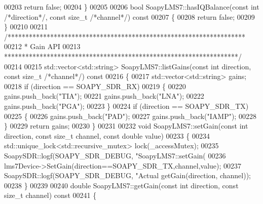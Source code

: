 \begin{DoxyCode}
{{{{{{00203     \textcolor{keywordflow}{return} \textcolor{keyword}{false};
00204 \}
00205 
00206 \textcolor{keywordtype}{bool} SoapyLMS7::hasIQBalance(\textcolor{keyword}{const} \textcolor{keywordtype}{int} \textcolor{comment}{/*direction*/}, \textcolor{keyword}{const} \textcolor{keywordtype}{size\_t} \textcolor{comment}{/*channel*/})\textcolor{keyword}{ const}
00207 \textcolor{keyword}{}\{
00208     \textcolor{keywordflow}{return} \textcolor{keyword}{false};
00209 \}
00210 
00211 \textcolor{comment}{/*******************************************************************}
00212 \textcolor{comment}{ * Gain API}
00213 \textcolor{comment}{ ******************************************************************/}
00214 
00215 std::vector<std::string> SoapyLMS7::listGains(\textcolor{keyword}{const} \textcolor{keywordtype}{int} direction, \textcolor{keyword}{const} \textcolor{keywordtype}{size\_t} \textcolor{comment}{/*channel*/})\textcolor{keyword}{ const}
00216 \textcolor{keyword}{}\{
00217     std::vector<std::string> gains;
00218     \textcolor{keywordflow}{if} (direction == SOAPY_SDR_RX)
00219     \{
00220         gains.push\_back(\textcolor{stringliteral}{"TIA"});
00221         gains.push\_back(\textcolor{stringliteral}{"LNA"});
00222         gains.push\_back(\textcolor{stringliteral}{"PGA"});
00223     \}
00224     \textcolor{keywordflow}{if} (direction == SOAPY_SDR_TX)
00225     \{
00226         gains.push\_back(\textcolor{stringliteral}{"PAD"});
00227         gains.push\_back(\textcolor{stringliteral}{"IAMP"});
00228     \}
00229     \textcolor{keywordflow}{return} gains;
00230 \}
00231 
00232 \textcolor{keywordtype}{void} SoapyLMS7::setGain(\textcolor{keyword}{const} \textcolor{keywordtype}{int} direction, \textcolor{keyword}{const} \textcolor{keywordtype}{size\_t} channel, \textcolor{keyword}{const} \textcolor{keywordtype}{double} value)
00233 \{
00234     std::unique\_lock<std::recursive\_mutex> lock(_accessMutex);
00235     SoapySDR::logf(SOAPY_SDR_DEBUG, \textcolor{stringliteral}{"SoapyLMS7::setGain(%
00236     lms7Device->SetGain(direction==SOAPY_SDR_TX,channel,value);
00237     SoapySDR::logf(SOAPY_SDR_DEBUG, \textcolor{stringliteral}{"Actual %
      getGain(direction, channel));
00238 \}
00239 
00240 \textcolor{keywordtype}{double} SoapyLMS7::getGain(\textcolor{keyword}{const} \textcolor{keywordtype}{int} direction, \textcolor{keyword}{const} \textcolor{keywordtype}{size\_t} channel)\textcolor{keyword}{ const}
00241 \textcolor{keyword}{}\{
}}}}}}}}
\end{DoxyCode}
